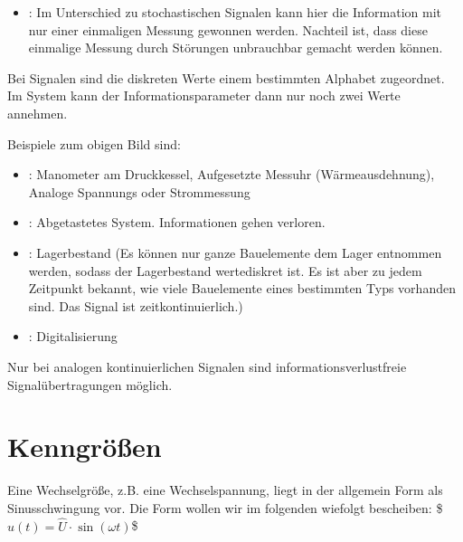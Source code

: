 \documentclass[letterpaper,10pt,english]{jupyterBook}
\begin{document}
\begin{itemize}
\item {} 
\sphinxAtStartPar
{}: Im Unterschied zu stochastischen Signalen kann hier die Information mit nur einer einmaligen Messung gewonnen werden. Nachteil ist, dass diese einmalige Messung durch Störungen unbrauchbar gemacht werden können.

\end{itemize}

\sphinxAtStartPar
Bei  Signalen sind die diskreten Werte einem bestimmten Alphabet zugeordnet. Im  System kann der Informationsparameter dann nur noch zwei Werte annehmen.

\sphinxAtStartPar
Beispiele zum obigen Bild sind:
\begin{itemize}
\item {} 
\sphinxAtStartPar
{}: Manometer am Druckkessel, Aufgesetzte Messuhr (Wärmeausdehnung), Analoge Spannungs\sphinxhyphen{} oder Strommessung

\item {} 
\sphinxAtStartPar
{}: Abgetastetes System. Informationen gehen verloren.

\item {} 
\sphinxAtStartPar
{}: Lagerbestand (Es können nur ganze Bauelemente dem Lager entnommen werden, sodass der Lagerbestand wertediskret ist. Es ist aber zu jedem Zeitpunkt bekannt, wie viele Bauelemente eines bestimmten Typs vorhanden sind. Das Signal ist zeitkontinuierlich.)

\item {} 
\sphinxAtStartPar
{}: Digitalisierung

\end{itemize}

\sphinxAtStartPar
Nur bei analogen kontinuierlichen Signalen sind informationsverlustfreie Signalübertragungen möglich.

\sphinxstepscope


\section{Kenngrößen}
\label{\detokenize{content/3_Kenngroessen:kenngroszen}}\label{\detokenize{content/3_Kenngroessen::doc}}
\sphinxAtStartPar
Eine Wechselgröße, z.B. eine Wechselspannung, liegt in der allgemein Form als Sinusschwingung vor. Die Form wollen wir im folgenden wiefolgt bescheiben:
\$\(u(t) = \hat U \cdot \sin(\omega t)\)\$
\end{document}
